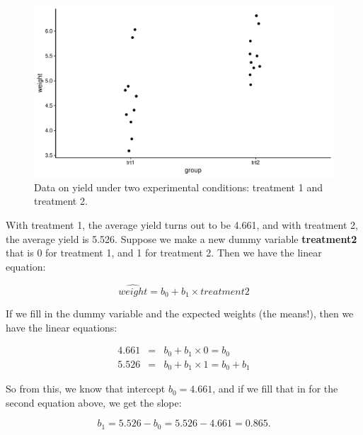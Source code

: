\documentclass[]{book}\usepackage[]{graphicx}\usepackage[]{color}
\makeatletter
\def\maxwidth{ %
  \ifdim\Gin@nat@width>\linewidth
    \linewidth
  \else
    \Gin@nat@width
  \fi
}
\newenvironment{knitrout}{}{} %
\makeatother
\begin{document}
\begin{knitrout}
\color{fgcolor}\begin{figure}

{\centering \includegraphics[width=\maxwidth]{figure/dummy_8-1} 

}

\caption[Data on yield under two experimental conditions]{Data on yield under two experimental conditions: treatment 1 and treatment 2.}\label{fig:dummy_8}
\end{figure}


\end{knitrout}

With treatment 1, the average yield turns out to be 4.661, and with treatment 2, the average yield is 5.526. Suppose we make a new dummy variable \textbf{treatment2} that is 0 for treatment 1, and 1 for treatment 2. Then we have the linear equation:

\begin{equation}
\widehat{weight} = b_0 + b_1 \times treatment2
\end{equation}

If we fill in the dummy variable and the expected weights (the means!), then we have the linear equations:


\begin{eqnarray}
4.661 &=& b_0 + b_1 \times 0 = b_0 \\
5.526 &=& b_0 + b_1 \times 1 = b_0 + b_1
\end{eqnarray}

So from this, we know that intercept $b_0 = 4.661$, and if we fill that in for the second equation above, we get the slope: 

\begin{equation}
b_1 = 5.526-b_0= 5.526 -4.661= 0.865.
\end{equation}
\end{document}

